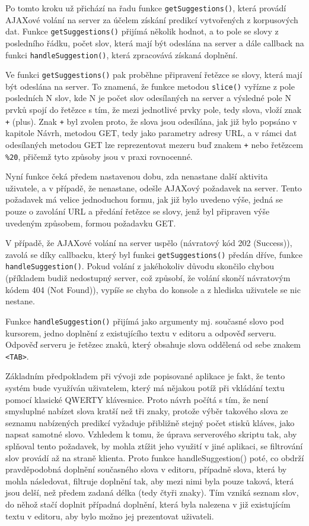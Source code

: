 \documentclass[a4paper,11pt]{article}
\begin{document}
Po tomto kroku už přichází na řadu funkce {\tt getSuggestions()}, která provádí AJAXové volání na server za účelem získání predikcí vytvořených z korpusových dat. Funkce {\tt getSuggestions()} přijímá několik hodnot, a to pole se slovy z posledního řádku, počet slov, která mají být odeslána na server a dále callback na funkci {\tt handleSuggestion()}, která zpracovává získaná doplnění.

Ve funkci {\tt getSuggestions()} pak proběhne připravení řetězce se slovy, která mají být odeslána na server. To znamená, že funkce metodou {\tt slice()} vyřízne z pole posledních N slov, kde N je počet slov odesílaných na server a výsledné pole N prvků spojí do řetězce s tím, že mezi jednotlivé prvky pole, tedy slova, vloží znak {\tt +} (plus). Znak {\tt +} byl zvolen proto, že slova jsou odesílána, jak již bylo popsáno v kapitole Návrh, metodou GET, tedy jako parametry adresy URL, a v rámci dat odesílaných metodou GET lze reprezentovat mezeru buď znakem {\tt +} nebo řetězcem {\tt \%20}, přičemž tyto způsoby jsou v praxi rovnocenné.

Nyní funkce čeká předem nastavenou dobu, zda nenastane další aktivita uživatele, a v případě, že nenastane, odešle AJAXový požadavek na server. Tento požadavek má velice jednoduchou formu, jak již bylo uvedeno výše, jedná se pouze o zavolání URL a předání řetězce se slovy, jenž byl připraven výše uvedeným způsobem, formou požadavku GET.

V případě, že AJAXové volání na server uspělo (návratový kód 202 (Success)), zavolá se díky callbacku, který byl funkci {\tt getSuggestions()} předán dříve, funkce {\tt handleSuggestion()}. Pokud volání z jakéhokoliv důvodu skončilo chybou (příkladem budiž nedostupný server, což způsobí, že volání skončí návratovým kódem 404 (Not Found)), vypíše se chyba do konsole a z hlediska uživatele se nic nestane. 

Funkce {\tt handleSuggestion()} přijímá jako argumenty mj. současné slovo pod kursorem, jedno doplnění z existujícího textu v editoru a odpověď serveru. Odpověď serveru je řetězec znaků, který obsahuje slova oddělená od sebe znakem {\tt <TAB>}. 

Základním předpokladem při vývoji zde popisované aplikace je fakt, že tento systém bude využíván uživatelem, který má nějakou potíž při vkládání textu pomocí klasické QWERTY klávesnice. Proto návrh počítá s tím, že není smysluplné nabízet slova kratší než tři znaky, protože výběr takového slova ze seznamu nabízených predikcí vyžaduje přibližně stejný počet stisků kláves, jako napsat samotné slovo. Vzhledem k tomu, že úprava serverového skriptu tak, aby splňoval tento požadavek, by mohla ztížit jeho využití v jiné aplikaci, se filtrování slov provádí až na straně klienta. Proto funkce handleSuggestion() poté, co obdrží pravděpodobná doplnění současného slova v editoru, případně slova, která by mohla následovat, filtruje doplnění tak, aby mezi nimi byla pouze taková, která jsou delší, než předem zadaná délka (tedy čtyři znaky). Tím vzniká seznam slov, do něhož stačí doplnit případná doplnění, která byla nalezena v již existujícím textu v editoru, aby bylo možno jej prezentovat uživateli.
\end{document}
